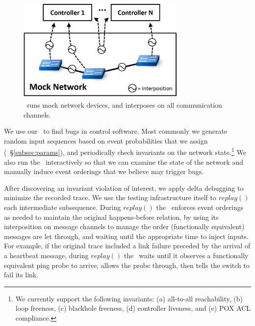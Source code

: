 \begin{figure}[tb]
    \includegraphics[width=3.25in]{../diagrams/architecture/Debugger_Architecture.png}
    \caption[]{\label{fig:architecture} \projectname~runs mock
    network devices, and interposes on all communication
    channels.}
    \vspace{-1em}
\end{figure}

We use our \tester~to find bugs in control software.
Most commonly we generate random input
sequences based on event probabilities that we assign (\cf~\S\ref{subsec:params}), and periodically
check invariants on the network state.\footnote{We currently support the following invariants:
  (a) all-to-all reachability, (b) loop freeness, (c) blackhole freeness, (d) controller
liveness, and (e) POX ACL compliance.
}
We also run the \tester~interactively
so that we can examine the state of the network
and manually induce event orderings that we believe may trigger bugs.

 After discovering an invariant
violation of interest, we apply delta debugging to minimize the recorded trace. We use the
testing infrastructure itself to $replay()$ each intermediate subsequence.
During $replay()$ the \tester~enforces event orderings as needed to maintain the original happens-before
relation, by using its interposition on message channels to
manage the order (functionally equivalent) messages are let through,
and waiting until the appropriate time to inject inputs. For example, if the
original trace included a link failure preceded by the arrival of a heartbeat
message, during $replay()$ the \tester~waits until it observes
a functionally equivalent ping probe to arrive, allows the probe
through, then tells the switch to fail its link. %

